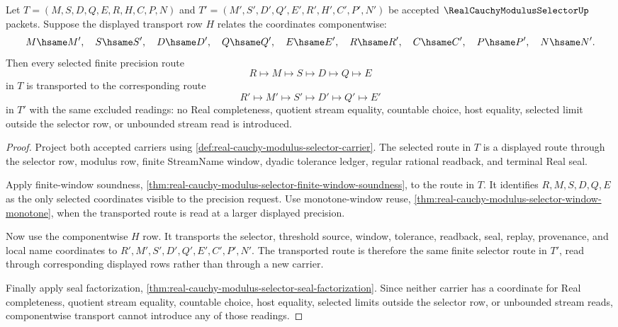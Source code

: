\begin{theorem}
\label{thm:real-cauchy-modulus-selector-selector-transport-naturality}
Let $T=(M,S,D,Q,E,R,H,C,P,N)$ and $T'=(M',S',D',Q',E',R',H',C',P',N')$ be accepted $\RealCauchyModulusSelectorUp$ packets. Suppose the displayed transport row $H$ relates the coordinates componentwise:
$$
M\hsame M',\quad
S\hsame S',\quad
D\hsame D',\quad
Q\hsame Q',\quad
E\hsame E',\quad
R\hsame R',\quad
C\hsame C',\quad
P\hsame P',\quad
N\hsame N'.
$$
Then every selected finite precision route
$$
R\longmapsto M\longmapsto S\longmapsto D\longmapsto Q\longmapsto E
$$
in $T$ is transported to the corresponding route
$$
R'\longmapsto M'\longmapsto S'\longmapsto D'\longmapsto Q'\longmapsto E'
$$
in $T'$ with the same excluded readings: no Real completeness, quotient stream equality, countable choice, host equality, selected limit outside the selector row, or unbounded stream read is introduced.
\end{theorem}
\begin{proof}
Project both accepted carriers using \autoref{def:real-cauchy-modulus-selector-carrier}. The selected route in $T$ is a displayed route through the selector row, modulus row, finite StreamName window, dyadic tolerance ledger, regular rational readback, and terminal Real seal.

Apply finite-window soundness, \autoref{thm:real-cauchy-modulus-selector-finite-window-soundness}, to the route in $T$. It identifies $R,M,S,D,Q,E$ as the only selected coordinates visible to the precision request. Use monotone-window reuse, \autoref{thm:real-cauchy-modulus-selector-window-monotone}, when the transported route is read at a larger displayed precision.

Now use the componentwise $H$ row. It transports the selector, threshold source, window, tolerance, readback, seal, replay, provenance, and local name coordinates to $R',M',S',D',Q',E',C',P',N'$. The transported route is therefore the same finite selector route in $T'$, read through corresponding displayed rows rather than through a new carrier.

Finally apply seal factorization, \autoref{thm:real-cauchy-modulus-selector-seal-factorization}. Since neither carrier has a coordinate for Real completeness, quotient stream equality, countable choice, host equality, selected limits outside the selector row, or unbounded stream reads, componentwise transport cannot introduce any of those readings.
\end{proof}

